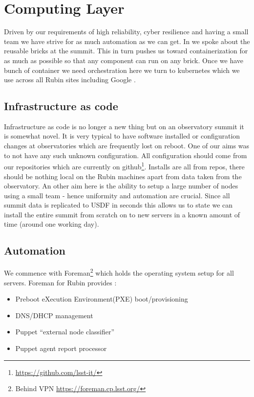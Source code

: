 \section{Computing Layer} \label{sec:computing}

Driven by our requirements of high reliability, cyber resilience and having a small team we have strive for as much automation as we can get.
In  we spoke about the reusable bricks at the summit.
This in turn pushes us toward containerization for as much as possible so that any component can run on any brick.
Once we have  bunch of container we need orchestration here we turn to kubernetes which we use across all Rubin sites including Google \citep{2021arXiv211115030O}.


\subsection{Infrastructure as code \label{sec:iac}}
Infrastructure as code is no longer a new thing \citep{Morris2021IaC} but on an observatory summit it is
somewhat novel.
It is very typical to have software installed or configuration changes at observatories which are frequently lost on reboot.
One of our aims was to not have any such unknown configuration.
All configuration should come from our repositories which are currently on github\footnote{\url{https://github.com/lsst-it/}}.
Installs are all from repos, there should be nothing local on the Rubin machines apart from data taken from the observatory.
An other aim here is the ability to setup a large number of nodes using a small team - hence uniformity and automation are crucial.
Since all summit data is replicated to USDF in seconds this allows us to state we can install the entire summit from scratch on to new servers in a known amount of time (around one working day).


\subsection{Automation}
We commence with Foreman\footnote{Behind VPN \url{https://foreman.cp.lsst.org/}} which holds the operating system setup for all servers.
Foreman for Rubin\citep{ITTN-011} provides :

\begin{itemize}
\item Preboot eXecution Environment(PXE) boot/provisioning
\item DNS/DHCP management
\item Puppet “external node classifier”
\item Puppet agent report processor
\end{itemize}

